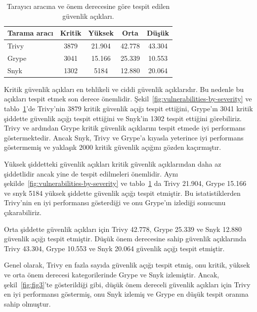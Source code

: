 \begin{table}[!htbp]
    \caption{Tarayıcı aracına ve önem derecesine göre tespit edilen güvenlik açıkları.}\label{tab:scanner-vuln-severity}
    \centering
    \begin{tabular}{ |l|c|c|c|c| }
        \hline
        Tarama aracı & Kritik & Yüksek & Orta & Düşük \\
        \hline
        Trivy & 3879 & 21.904 & 42.778 & 43.304 \\
        Grype & 3041 & 15.166 & 25.339 & 10.553 \\
        Snyk  & 1302 & 5184  & 12.880 & 20.064 \\
        \hline
    \end{tabular}
\end{table}

Kritik güvenlik açıkları en tehlikeli ve ciddi güvenlik açıklarıdır. Bu nedenle bu açıkları tespit etmek son derece önemlidir. Şekil~\ref{fig:vulnerabilities-by-severity} ve tablo~\ref{tab:scanner-vuln-severity}'de Trivy'nin 3879 kritik güvenlik açığı tespit ettiğini, Grype'ın 3041 kritik şiddette güvenlik açığı tespit ettiğini ve Snyk'in 1302 tespit ettiğini görebiliriz. Trivy ve ardından Grype kritik güvenlik açıklarını tespit etmede iyi performans göstermektedir. Ancak Snyk, Trivy ve Grype'a kıyasla yeterince iyi performans göstermemiş ve yaklaşık 2000 kritik güvenlik açığını gözden kaçırmıştır.

Yüksek şiddetteki güvenlik açıkları kritik güvenlik açıklarından daha az şiddetlidir ancak yine de tespit edilmeleri önemlidir. Aynı şekilde~\ref{fig:vulnerabilities-by-severity} ve tablo~\ref{tab:scanner-vuln-severity} da Trivy 21.904, Grype 15.166 ve snyk 5184 yüksek şiddette güvenlik açığı tespit etmiştir. Bu istatistiklerden Trivy'nin en iyi performansı gösterdiği ve onu Grype'ın izlediği sonucunu çıkarabiliriz.

Orta şiddette güvenlik açıkları için Trivy 42.778, Grype 25.339 ve Snyk 12.880 güvenlik açığı tespit etmiştir. Düşük önem derecesine sahip güvenlik açıklarında Trivy 43.304, Grype 10.553 ve Snyk 20.064 güvenlik açığı tespit etmiştir.

Genel olarak, Trivy en fazla sayıda güvenlik açığı tespit etmiş, onu kritik, yüksek ve orta önem derecesi kategorilerinde Grype ve Snyk izlemiştir. Ancak, şekil~\ref{fig:fig3}'te gösterildiği gibi, düşük önem dereceli güvenlik açıkları için Trivy en iyi performansı göstermiş, onu Snyk izlemiş ve Grype en düşük tespit oranına sahip olmuştur.

